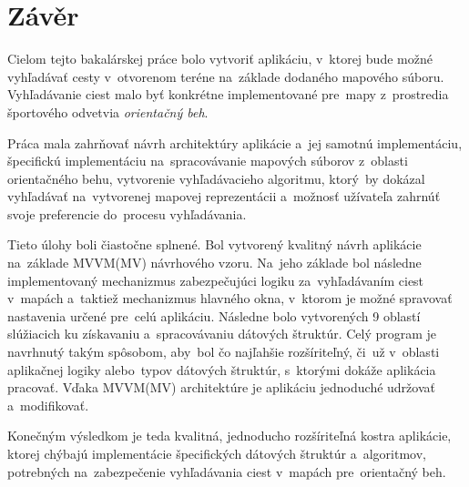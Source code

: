 \chapter*{Závěr}

Cielom tejto bakalárskej práce bolo vytvoriť aplikáciu, v~ktorej bude možné vyhľadávať cesty v~otvorenom teréne na~základe dodaného mapového súboru. Vyhľadávanie ciest malo byť konkrétne implementované pre~mapy z~prostredia športového odvetvia \textit{orientačný beh}. 

Práca mala zahrňovať návrh architektúry aplikácie a~jej samotnú implementáciu, špecifickú implementáciu na~spracovávanie mapových súborov z~oblasti orientačného behu, vytvorenie vyhľadávacieho algoritmu, ktorý~by dokázal vyhľadávať na~vytvorenej mapovej reprezentácii a~možnosť užívateľa zahrnúť svoje preferencie do~procesu vyhľadávania. 

Tieto úlohy boli čiastočne splnené. Bol vytvorený kvalitný návrh aplikácie na~základe MVVM(MV) návrhového vzoru. Na~jeho základe bol následne implementovaný mechanizmus zabezpečujúci logiku za~vyhľadávaním ciest v~mapách a~taktiež mechanizmus hlavného okna, v~ktorom je možné spravovať nastavenia určené pre~celú aplikáciu. Následne bolo vytvorených 9 oblastí slúžiacich ku získavaniu a~spracovávaniu dátových štruktúr. Celý program je navrhnutý takým spôsobom, aby~bol čo najľahšie rozšíriteľný, či~už v~oblasti aplikačnej logiky alebo~typov dátových štruktúr, s~ktorými dokáže aplikácia pracovať. Vďaka MVVM(MV) architektúre je aplikáciu jednoduché udržovať a~modifikovať. 

Konečným výsledkom je teda kvalitná, jednoducho rozšíriteľná kostra aplikácie, ktorej chýbajú implementácie špecifických dátových štruktúr a~algoritmov, potrebných na~zabezpečenie vyhľadávania ciest v~mapách pre~orientačný beh.